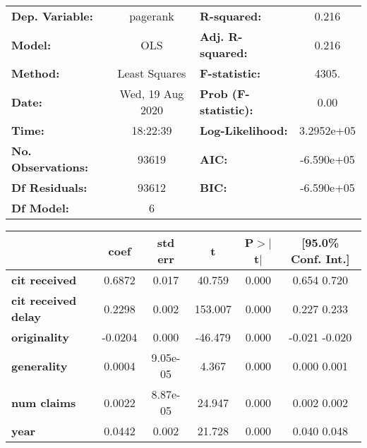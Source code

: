 \begin{center}
\begin{tabular}{lclc}
\toprule
\textbf{Dep. Variable:}     &     pagerank     & \textbf{  R-squared:         } &       0.216     \\
\textbf{Model:}             &       OLS        & \textbf{  Adj. R-squared:    } &       0.216     \\
\textbf{Method:}            &  Least Squares   & \textbf{  F-statistic:       } &       4305.     \\
\textbf{Date:}              & Wed, 19 Aug 2020 & \textbf{  Prob (F-statistic):} &       0.00      \\
\textbf{Time:}              &     18:22:39     & \textbf{  Log-Likelihood:    } &   3.2952e+05    \\
\textbf{No. Observations:}  &       93619      & \textbf{  AIC:               } &   -6.590e+05    \\
\textbf{Df Residuals:}      &       93612      & \textbf{  BIC:               } &   -6.590e+05    \\
\textbf{Df Model:}          &           6      & \textbf{                     } &                 \\
\bottomrule
\end{tabular}
\begin{tabular}{lccccc}
                            & \textbf{coef} & \textbf{std err} & \textbf{t} & \textbf{P$>$$|$t$|$} & \textbf{[95.0\% Conf. Int.]}  \\
\midrule
\textbf{cit received}       &       0.6872  &        0.017     &    40.759  &         0.000        &         0.654     0.720       \\
\textbf{cit received delay} &       0.2298  &        0.002     &   153.007  &         0.000        &         0.227     0.233       \\
\textbf{originality}        &      -0.0204  &        0.000     &   -46.479  &         0.000        &        -0.021    -0.020       \\
\textbf{generality}         &       0.0004  &     9.05e-05     &     4.367  &         0.000        &         0.000     0.001       \\
\textbf{num claims}         &       0.0022  &     8.87e-05     &    24.947  &         0.000        &         0.002     0.002       \\
\textbf{year}               &       0.0442  &        0.002     &    21.728  &         0.000        &         0.040     0.048       \\

\end{tabular}
\end{center}
